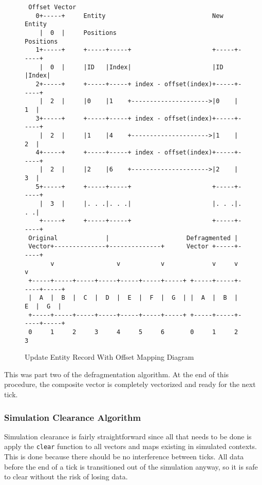\begin{figure}[H]
\begin{verbatim}                                                                 
 Offset Vector                                                                 
   0+-----+     Entity                             New Entity             
    |  0  |     Positions                          Positions                        
   1+-----+     +-----+-----+                      +-----+-----+            
    |  0  |     |ID   |Index|                      |ID   |Index|            
   2+-----+     +-----+-----+ index - offset(index)+-----+-----+            
    |  2  |     |0    |1    +--------------------->|0    |  1  |            
   3+-----+     +-----+-----+ index - offset(index)+-----+-----+            
    |  2  |     |1    |4    +--------------------->|1    |  2  |            
   4+-----+     +-----+-----+ index - offset(index)+-----+-----+            
    |  2  |     |2    |6    +--------------------->|2    |  3  |            
   5+-----+     +-----+-----+                      +-----+-----+            
    |  3  |     |. . .|. . .|                      |. . .|. . .|            
    +-----+     +-----+-----+                      +-----+-----+            
 Original             |                     Defragmented |                  
 Vector+--------------+--------------+      Vector +-----+-----+            
       v                 v           v             v     v     v            
 +-----+-----+-----+-----+-----+-----+-----+ +-----+-----+-----+-----+      
 |  A  |  B  |  C  |  D  |  E  |  F  |  G  | |  A  |  B  |  E  |  G  |      
 +-----+-----+-----+-----+-----+-----+-----+ +-----+-----+-----+-----+      
 0     1     2     3     4     5     6       0     1     2     3            
\end{verbatim}
\caption{Update Entity Record With Offset Mapping Diagram}
\label{code:component_retrieval}
\end{figure}

This was part two of the defragmentation algorithm. At the end of this procedure, the composite vector is completely vectorized and ready for the next tick.

\subsubsection{Simulation Clearance Algorithm}
Simulation clearance is fairly straightforward since all that needs to be done is apply the \texttt{clear} function to all vectors and maps existing in simulated contexts. This is done because there should be no interference between ticks. All data before the end of a tick is transitioned out of the simulation anyway, so it is safe to clear without the risk of losing data.


